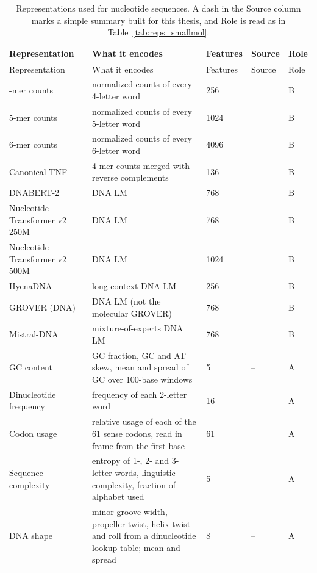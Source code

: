 {\let\small\footnotesize
\begin{longtable}{P{3.0cm}P{5.0cm}P{1.5cm}P{1.5cm}P{1.4cm}}
\caption[Representations used for nucleotide sequences.]{Representations used for nucleotide sequences. A dash in the Source column marks a simple summary built for this thesis, and Role is read as in Table~\ref{tab:reps_smallmol}.}\label{tab:reps_nucleotides}\\
\toprule
Representation & What it encodes & Features & Source & Role \\
\midrule
\endfirsthead
\toprule
Representation & What it encodes & Features & Source & Role \\
\midrule
\endhead
\bottomrule
{}-mer counts & normalized counts of every 4-letter word & 256 & \citep{Vinga2003} & B \\
5-mer counts & normalized counts of every 5-letter word & 1024 & \citep{Vinga2003} & B \\
6-mer counts & normalized counts of every 6-letter word & 4096 & \citep{Vinga2003} & B \\
Canonical TNF & 4-mer counts merged with reverse complements & 136 & \citep{Teeling2004TETRA} & B \\
DNABERT-2 & DNA LM & 768 & \citep{Zhou2023DNABERT2} & B \\
Nucleotide Transformer v2 250M & DNA LM & 768 & \citep{DallaTorre2025} & B \\
Nucleotide Transformer v2 500M & DNA LM & 1024 & \citep{DallaTorre2025} & B \\
HyenaDNA & long-context DNA LM & 256 & \citep{Nguyen2023HyenaDNA} & B \\
GROVER (DNA) & DNA LM (not the molecular GROVER) & 768 & \citep{Sanabria2024} & B \\
Mistral-DNA & mixture-of-experts DNA LM & 768 & \citep{Mourad2024} & B \\
GC content & GC fraction, GC and AT skew, mean and spread of GC over 100-base windows & 5 & -- & A \\
Dinucleotide frequency & frequency of each 2-letter word & 16 & \citep{Vinga2003} & A \\
Codon usage & relative usage of each of the 61 sense codons, read in frame from the first base & 61 & \citep{Sharp1986} & A \\
Sequence complexity & entropy of 1-, 2- and 3-letter words, linguistic complexity, fraction of alphabet used & 5 & -- & A \\
DNA shape & minor groove width, propeller twist, helix twist and roll from a dinucleotide lookup table; mean and spread & 8 & -- & A \\
\end{longtable}}

